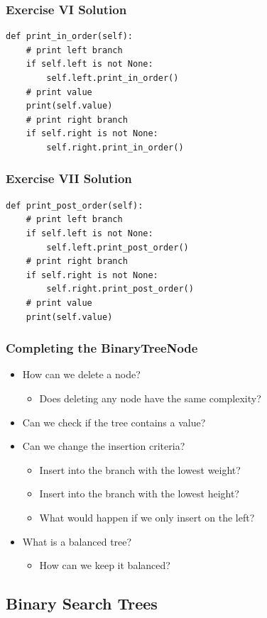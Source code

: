 \documentclass[11pt]{beamer}
\begin{document}
\begin{frame}[fragile]\frametitle{Exercise VI Solution}
\begin{lstlisting}
def print_in_order(self):
    # print left branch
    if self.left is not None:
        self.left.print_in_order()
    # print value
    print(self.value)
    # print right branch
    if self.right is not None:
        self.right.print_in_order()
\end{lstlisting}
\end{frame}

\begin{frame}[fragile]\frametitle{Exercise VII Solution}
\begin{lstlisting}
def print_post_order(self):
    # print left branch
    if self.left is not None:
        self.left.print_post_order()
    # print right branch
    if self.right is not None:
        self.right.print_post_order()
    # print value
    print(self.value)
\end{lstlisting}
\end{frame}

\begin{frame}\frametitle{Completing the BinaryTreeNode}
\begin{itemize}
\item How can we delete a node?
    \begin{itemize}
    \item Does deleting any node have the same complexity?
    \end{itemize}
\item Can we check if the tree contains a value?
\item Can we change the insertion criteria?
    \begin{itemize}
    \item Insert into the branch with the lowest weight?
    \item Insert into the branch with the lowest height?
    \item What would happen if we only insert on the left?
    \end{itemize}
\item What is a balanced tree?
    \begin{itemize}
    \item How can we keep it balanced?
    \end{itemize}
\end{itemize}
\end{frame}

\subsection{Binary Search Trees}
\end{document}
